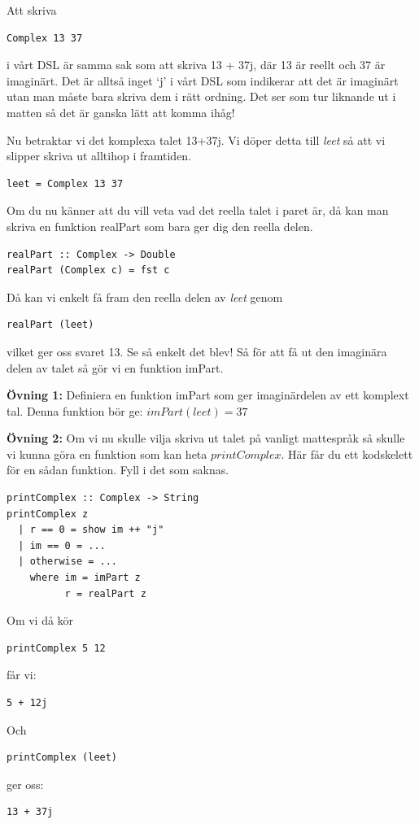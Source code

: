 \documentclass{article}
\begin{document}
Att skriva
\begin{verbatim}
Complex 13 37
\end{verbatim}
i vårt DSL är samma sak som att skriva 13 + 37j, där 13 är reellt och 37 är imaginärt. Det är alltså inget ‘j’ i vårt DSL som indikerar att det är imaginärt utan man måste bara skriva dem i rätt ordning. Det ser som tur liknande ut i matten så det är ganska lätt att komma ihåg! %

Nu betraktar vi det komplexa talet 13+37j. Vi döper detta till \emph{leet} så att vi slipper skriva ut alltihop i framtiden. \\
\begin{verbatim}
leet = Complex 13 37
\end{verbatim}
Om du nu känner att du vill veta vad det reella talet i paret är, då kan man skriva en funktion realPart som bara ger dig den reella delen. \\
\begin{verbatim}
realPart :: Complex -> Double
realPart (Complex c) = fst c
\end{verbatim}
Då kan vi enkelt få fram den reella delen av \emph{leet} genom\\
\begin{verbatim}
realPart (leet)
\end{verbatim}
vilket ger oss svaret 13.
Se så enkelt det blev!
Så för att få ut den imaginära delen av talet så gör vi en funktion imPart.

\textbf{Övning 1:} Definiera en funktion imPart som ger imaginärdelen av ett komplext tal.
Denna funktion bör ge: $imPart (leet) = 37$

\textbf{Övning 2:} Om vi nu skulle vilja skriva ut talet på vanligt mattespråk så skulle vi kunna göra en funktion som kan heta $printComplex$. Här får du ett kodskelett för en sådan funktion. Fyll i det som saknas.
\begin{verbatim}
printComplex :: Complex -> String
printComplex z
  | r == 0 = show im ++ "j"
  | im == 0 = ...
  | otherwise = ...
    where im = imPart z
          r = realPart z
\end{verbatim}
Om vi då kör
\begin{verbatim}
printComplex 5 12
\end{verbatim}
får vi:
\begin{verbatim}
5 + 12j
\end{verbatim}
Och
\begin{verbatim}
printComplex (leet)
\end{verbatim}
ger oss:
\begin{verbatim}
13 + 37j
\end{verbatim}
\end{document}
